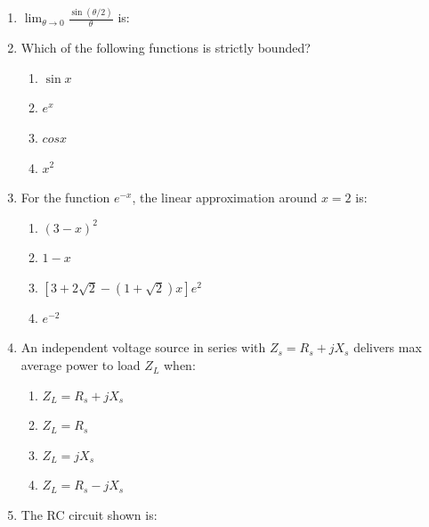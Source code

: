 \documentclass[journal,12pt,onecolumn]{IEEEtran}
\theoremstyle{remark}
\begin{document}
\begin{enumerate}
\item $ \lim_{\theta \to 0} \frac{\sin(\theta/2)}{\theta} $ is: 
\hfill{}
\begin{enumerate}
\end{enumerate}

\item Which of the following functions is strictly bounded? 
\hfill{}
\begin{multicols}{4}
\begin{enumerate}
    \item $ \sin x $
    \item $ e^x $
    \item $ cos x $
    \item $ x^2 $
\end{enumerate}
\end{multicols}

\item For the function $ e^{-x} $, the linear approximation around $ x = 2 $ is:
\hfill{}
\begin{enumerate}
    \item $ (3 - x)^2 $
    \item $ 1 - x $
    \item $ [3 + 2\sqrt{2} - (1 + \sqrt{2})x]e^2 $
    \item $ e^{-2} $
\end{enumerate}

\item An independent voltage source in series with $ Z_s = R_s + jX_s $ delivers max average power to load $ Z_L $ when:
\hfill{}
\begin{enumerate}
    \item $ Z_L = R_s + jX_s $
    \item $ Z_L = R_s $
    \item $ Z_L = jX_s $
    \item $ Z_L = R_s - jX_s $
\end{enumerate}


\item The RC circuit shown is:


\end{enumerate}
\end{document}
